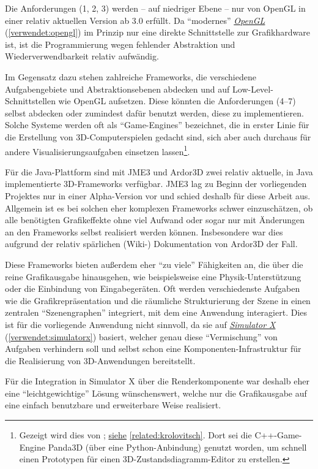 \documentclass[a4paper,10pt]{sphinxmanual}
\begin{document}
Die Anforderungen (1, 2, 3) werden – auf niedriger Ebene – nur von OpenGL in einer relativ aktuellen Version ab 3.0 erfüllt.
Da "`modernes"' {\hyperref[verwendet:opengl]{\emph{OpenGL}}} (\autoref*{verwendet:opengl}) im Prinzip nur eine direkte Schnittstelle zur Grafikhardware ist, ist die Programmierung wegen fehlender Abstraktion und Wiederverwendbarkeit relativ aufwändig.

Im Gegensatz dazu stehen zahlreiche Frameworks, die verschiedene Aufgabengebiete und Abstraktionsebenen abdecken und auf Low-Level-Schnittstellen wie OpenGL aufsetzen.
Diese könnten die Anforderungen (4–7) selbst abdecken oder zumindest dafür benutzt werden, diese zu implementieren.
Solche Systeme werden oft als "`Game-Engines"' bezeichnet, die in erster Linie für die Erstellung von 3D-Computerspielen gedacht sind, sich aber auch durchaus für andere Visualisierungsaufgaben einsetzen lassen\footnote{
Gezeigt wird dies von \cite{alvergren_3d_2009}; {\hyperref[related:krolovitsch]{siehe}} \autoref*{related:krolovitsch}. Dort sei die C++-Game-Engine Panda3D (über eine Python-Anbindung) genutzt worden, um schnell einen Prototypen für einen 3D-Zustandsdiagramm-Editor zu erstellen.
}.

Für die Java-Plattform sind mit JME3 und Ardor3D zwei relativ aktuelle, in Java implementierte 3D-Frameworks verfügbar.
JME3 lag zu Beginn der vorliegenden Projektes nur in einer Alpha-Version vor und schied deshalb für diese Arbeit aus.
Allgemein ist es bei solchen eher komplexen Frameworks schwer einzuschätzen, ob alle benötigten Grafikeffekte ohne viel Aufwand oder sogar nur mit Änderungen an den Frameworks selbst realisiert werden können.
Insbesondere war dies aufgrund der relativ spärlichen (Wiki-) Dokumentation von Ardor3D der Fall.

Diese Frameworks bieten außerdem eher "`zu viele"' Fähigkeiten an, die über die reine Grafikausgabe hinausgehen, wie beispielsweise eine Physik-Unterstützung oder die Einbindung von Eingabegeräten.
Oft werden verschiedenste Aufgaben wie die Grafikrepräsentation und die räumliche Strukturierung der Szene in einen zentralen "`Szenengraphen"' integriert, mit dem eine Anwendung interagiert.
Dies ist für die vorliegende Anwendung nicht sinnvoll, da sie auf {\hyperref[verwendet:simulatorx]{\emph{Simulator X}}} (\autoref*{verwendet:simulatorx}) basiert, welcher genau diese "`Vermischung"' von Aufgaben verhindern soll und selbst schon eine Komponenten-Infrastruktur für die Realisierung von 3D-Anwendungen bereitstellt.

Für die Integration in Simulator X über die Renderkomponente war deshalb eher eine "`leichtgewichtige"' Lösung wünschenswert, welche nur die Grafikausgabe auf eine einfach benutzbare und erweiterbare Weise realisiert.
\end{document}
